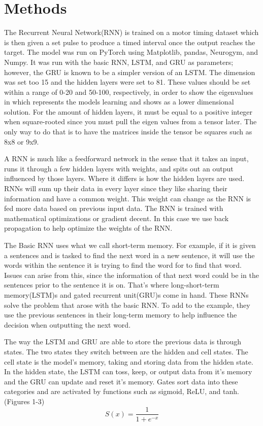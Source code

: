 \documentclass{article}
\begin{document}
\section{Methods\centering}
The Recurrent Neural Network(RNN) is trained on a motor timing dataset which is then given a set pulse to produce a timed interval once the output reaches the target. The model was run on PyTorch using Matplotlib, pandas, Neurogym, and Numpy. It was run with the basic RNN, LSTM, and GRU as parameters; however, the GRU is known to be a simpler version of an LSTM. The dimension was set too 15 and the hidden layers were set to 81. These values should be set within a range of 0-20 and 50-100, respectively, in order to show the eigenvalues in which represents the models learning and shows as a lower dimensional solution. For the amount of hidden layers, it must be equal to a positive integer when square-rooted since you must pull the eigen values from a tensor later. The only way to do that is to have the matrices inside the tensor be squares such as 8x8 or 9x9.
\par
\noindent{}
A RNN is much like a feedforward network in the sense that it takes an input, runs it through a few hidden layers with weights, and spits out an output influenced by those layers. Where it differs is how the hidden layers are used. RNNs will sum up their data in every layer since they like sharing their information and have a common weight. This weight can change as the RNN is fed more data based on previous input data. The RNN is trained with mathematical optimizations or gradient decent. In this case we use back propagation to help optimize the weights of the RNN.
\par\noindent{}
The Basic RNN uses what we call short-term memory. For example, if it is given a sentences and is tasked to find the next word in a new sentence, it will use the words within the sentence it is trying to find the word for to find that word. Issues can arise from this, since the information of that next word could be in the sentences prior to the sentence it is on. That's where long-short-term memory(LSTM)s and gated recurrent unit(GRU)s come in hand. These RNNs solve the problem that arose with the basic RNN. To add to the example, they use the previous sentences in their long-term memory to help influence the decision when outputting the next word. 
\par\noindent{}
The way the LSTM and GRU are able to store the previous data is through states. The two states they switch between are the hidden and cell states. The cell state is the model's memory, taking and storing data from the hidden state. In the hidden state, the LSTM can toss, keep, or output data from it's memory and the GRU can update and reset it's memory. Gates sort data into these categories and are activated by functions such as sigmoid, ReLU, and tanh.(Figures 1-3) 
\[  S(x) =  \frac{\mathrm{1} }{\mathrm{1} + e^{-x} }\]
\end{document}
